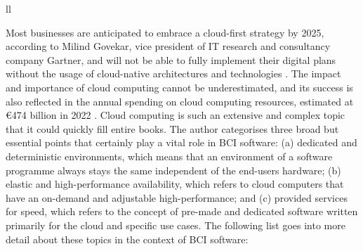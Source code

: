 \begin{table}[!ht]
{\begin{tabular}{ll}
       \\ \hline
    \end{tabular}%
  }
  \vspace{10pt}
  \caption[The three abstraction levels and types of cloud computing]{The three abstraction levels and types of cloud computing \citep{amazon_web_services_inc_what_nodate}.}
  \vspace{-5pt}
  \label{tab:cloud-computing-types}
\end{table}

Most businesses are anticipated to embrace a cloud-first strategy by 2025, according to Milind Govekar, vice president of IT research and consultancy company Gartner, and will not be able to fully implement their digital plans without the usage of cloud-native architectures and technologies  \citep{gartner_gartner_nodate}. The impact and importance of cloud computing cannot be underestimated, and its success is also reflected in the annual spending on cloud computing resources, estimated at €474 billion in 2022 \citep{gartner_gartner_nodate}. Cloud computing is such an extensive and complex topic that it could quickly fill entire books. The author categorises three broad but essential points that certainly play a vital role in BCI software: (a) dedicated and deterministic environments, which means that an environment of a software programme always stays the same independent of the end-users hardware; (b) elastic and high-performance availability, which refers to cloud computers that have an on-demand and adjustable high-performance; and (c) provided services for speed, which refers to the concept of pre-made and dedicated software written primarily for the cloud and specific use cases. The following list goes into more detail about these topics in the context of BCI software:

